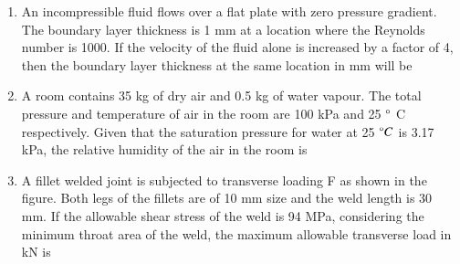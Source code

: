 \documentclass[journal,12pt,onecolumn]{IEEEtran}
\theoremstyle{remark}
\begin{document}
\begin{enumerate}
		\begin{figure}[H]
			\centering
			
			\caption{}
			\label{25}
		\end{figure}
		\begin{enumerate}
		\end{enumerate}
	\item An incompressible fluid flows over a flat plate with zero pressure  gradient. The boundary layer thickness is 1 mm at a location where the Reynolds number is 1000. If the velocity of the fluid alone is increased by a factor of 4, then the boundary layer thickness at the same location in mm will be
		\begin{enumerate}
				\begin{multicols}{4}
				\item 4
				\item 2
				\item 0.5
				\item 0.25
				\end{multicols}
		\end{enumerate}
	\item A room contains 35 kg of dry air and 0.5 kg of water vapour. The total pressure and temperature of air in the room are 100 kPa and 25 $\degree$ C respectively. Given that the saturation pressure for water at 25 $\degree C$ is 3.17 kPa, the relative humidity of the air in the room is
		\begin{enumerate}
				\begin{multicols}{4}
				\item 67 \%
				\item 55 \%
				\item 83 \%
				\item 71 \%
				\end{multicols}
		\end{enumerate}
	\item A fillet welded joint is subjected to transverse loading F as shown in the figure. Both legs of the fillets are of 10 mm size and the weld length is 30 mm. If the allowable shear stress of the weld is 94 MPa, considering the minimum throat area of the weld, the maximum allowable transverse load in kN is

\end{enumerate}
\end{document}
